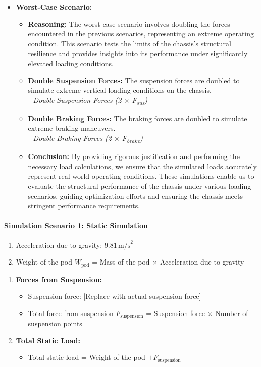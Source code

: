 	
\begin{itemize}  
  \item \textbf{Worst-Case Scenario:}
  \begin{itemize}
    \item \textbf{Reasoning:} The worst-case scenario involves doubling the forces encountered in the previous scenarios, representing an extreme operating condition. This scenario tests the limits of the chassis's structural resilience and provides insights into its performance under significantly elevated loading conditions.
    \item \textbf{Double Suspension Forces:} The suspension forces are doubled to simulate extreme vertical loading conditions on the chassis. \\
    \textit{- Double Suspension Forces (2 $\times$ F\textsubscript{sus})}
    \item \textbf{Double Braking Forces:} The braking forces are doubled to simulate extreme braking maneuvers. \\
    \textit{- Double Braking Forces (2 $\times$ F\textsubscript{brake})}
    \item \textbf{Conclusion:} By providing rigorous justification and performing the necessary load calculations, we ensure that the simulated loads accurately represent real-world operating conditions. These simulations enable us to evaluate the structural performance of the chassis under various loading scenarios, guiding optimization efforts and ensuring the chassis meets stringent performance requirements.
  \end{itemize}
\end{itemize}



\paragraph{Simulation Scenario 1: Static Simulation}
\begin{enumerate}
  \item Acceleration due to gravity: \(9.81 \, \text{m/s}^2\)
  \item Weight of the pod \(W_{\text{pod}}\) = Mass of the pod \(\times\) Acceleration due to gravity
\end{enumerate}

\begin{enumerate}
  \item \textbf{Forces from Suspension:}
  \begin{itemize}
    \item Suspension force: [Replace with actual suspension force]
    \item Total force from suspension \(F_{\text{suspension}}\) = Suspension force \(\times\) Number of suspension points
  \end{itemize}

  \item \textbf{Total Static Load:}
  \begin{itemize}
    \item Total static load = Weight of the pod \(+ F_{\text{suspension}}\)
  \end{itemize}
\end{enumerate}

